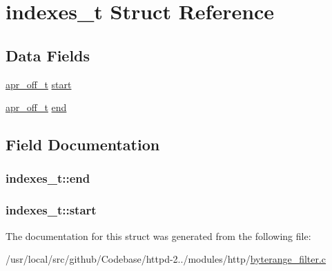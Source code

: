 \hypertarget{structindexes__t}{}\section{indexes\+\_\+t Struct Reference}
\label{structindexes__t}
\subsection*{Data Fields}
\begin{DoxyCompactItemize}
\item 
\hyperlink{group__apr__platform_ga6938af9075cec15c88299109381aa984}{apr\+\_\+off\+\_\+t} \hyperlink{structindexes__t_a9e2e2b96d05ea4854f9fb3884f6ea114}{start}
\item 
\hyperlink{group__apr__platform_ga6938af9075cec15c88299109381aa984}{apr\+\_\+off\+\_\+t} \hyperlink{structindexes__t_aff00098b96f73eea80faa013145350db}{end}
\end{DoxyCompactItemize}


\subsection{Field Documentation}
\subsubsection[{\texorpdfstring{end}{end}}]{ indexes\+\_\+t\+::end}\hypertarget{structindexes__t_aff00098b96f73eea80faa013145350db}{}\label{structindexes__t_aff00098b96f73eea80faa013145350db}
\subsubsection[{\texorpdfstring{start}{start}}]{ indexes\+\_\+t\+::start}\hypertarget{structindexes__t_a9e2e2b96d05ea4854f9fb3884f6ea114}{}\label{structindexes__t_a9e2e2b96d05ea4854f9fb3884f6ea114}


The documentation for this struct was generated from the following file\+:\begin{DoxyCompactItemize}
\item 
/usr/local/src/github/\+Codebase/httpd-\/2../modules/http/\hyperlink{byterange__filter_8c}{byterange\+\_\+filter.\+c}\end{DoxyCompactItemize}
